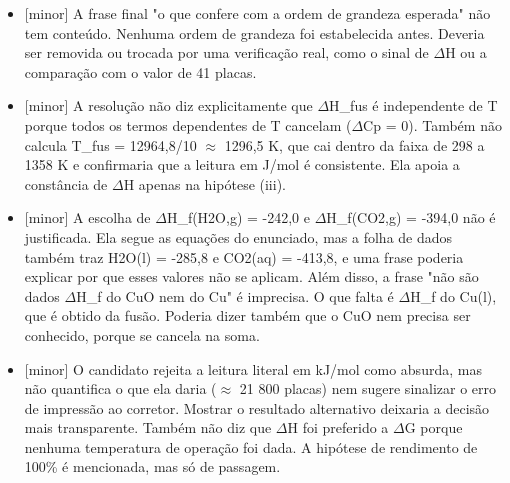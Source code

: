 \documentclass{article}%
\begin{document}
\begin{itemize}%
\item%
{[}minor{]} A frase final "o que confere com a ordem de grandeza esperada" não tem conteúdo. Nenhuma ordem de grandeza foi estabelecida antes. Deveria ser removida ou trocada por uma verificação real, como o sinal de $\Delta$H ou a comparação com o valor de 41 placas.%
\item%
{[}minor{]} A resolução não diz explicitamente que $\Delta$H\_fus é independente de T porque todos os termos dependentes de T cancelam ($\Delta$Cp = 0). Também não calcula T\_fus = 12964,8/10 $\approx$ 1296,5 K, que cai dentro da faixa de 298 a 1358 K e confirmaria que a leitura em J/mol é consistente. Ela apoia a constância de $\Delta$H apenas na hipótese (iii).%
\item%
{[}minor{]} A escolha de $\Delta$H\_f(H2O,g) = -242,0 e $\Delta$H\_f(CO2,g) = -394,0 não é justificada. Ela segue as equações do enunciado, mas a folha de dados também traz H2O(l) = -285,8 e CO2(aq) = -413,8, e uma frase poderia explicar por que esses valores não se aplicam. Além disso, a frase "não são dados $\Delta$H\_f do CuO nem do Cu" é imprecisa. O que falta é $\Delta$H\_f do Cu(l), que é obtido da fusão. Poderia dizer também que o CuO nem precisa ser conhecido, porque se cancela na soma.%
\item%
{[}minor{]} O candidato rejeita a leitura literal em kJ/mol como absurda, mas não quantifica o que ela daria ($\approx$ 21 800 placas) nem sugere sinalizar o erro de impressão ao corretor. Mostrar o resultado alternativo deixaria a decisão mais transparente. Também não diz que $\Delta$H foi preferido a $\Delta$G porque nenhuma temperatura de operação foi dada. A hipótese de rendimento de 100\% é mencionada, mas só de passagem.%
\end{itemize}%
\end{document}
